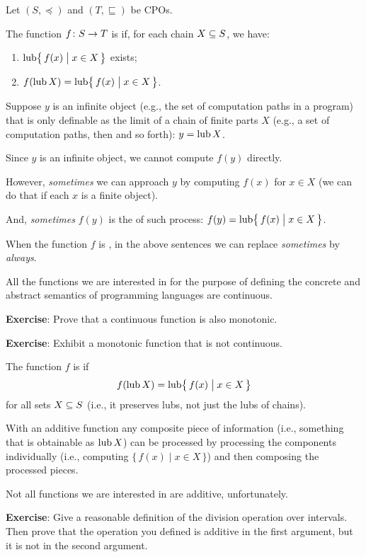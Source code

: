 \documentclass[online,helvetica,a4]{chaksem}
\begin{document}
\begin{slide} 

Let $(S, \preceq)$ and $(T, \sqsubseteq)$ be CPOs.

The function $\mathord{f}\colon S\to T$ is  if,
for each chain $X \subseteq S$, we have:
\begin{enumerate}
\item
$\mathop{\mathrm{lub}}\nolimits\bigl\{\, f(x) \bigm| x \in X \,\bigr\}$ exists;
\item
$f(\mathop{\mathrm{lub}}\nolimits X) = \mathop{\mathrm{lub}}\nolimits\bigl\{\, f(x) \bigm| x \in X \,\bigr\}$.
\end{enumerate}

Suppose $y$ is an infinite object
(e.g., the set of  computation paths in a program)
that is only definable as the limit of a chain of finite parts $X$
(e.g., a set of  computation paths, then 
and so forth): $y = \mathop{\mathrm{lub}}\nolimits X$.

Since $y$ is an infinite object, we cannot compute $f(y)$ directly.
\end{slide}

\begin{slide} 

However, \emph{sometimes} we can approach $y$ by computing $f(x)$ for $x \in X$
(we can do that if each $x$ is a finite object).

And, \emph{sometimes} $f(y)$ is the  of such process:
$f(y) = \mathop{\mathrm{lub}}\nolimits\bigl\{\, f(x) \bigm| x \in X \,\bigr\}$.

When the function $f$ is , in the above sentences
we can replace \emph{sometimes} by \emph{always}.

All the functions we are interested in for the purpose of defining the
concrete and abstract semantics of programming languages are continuous.

\vfill
\textbf{Exercise}: Prove that a continuous function is also monotonic.

\vfill
\textbf{Exercise}: Exhibit a monotonic function that is not continuous.

\end{slide}

\begin{slide} 

The function $f$ is  if
\[
	f(\mathop{\mathrm{lub}}\nolimits X) = \mathop{\mathrm{lub}}\nolimits\bigl\{\, f(x) \bigm| x \in X \,\bigr\}
\]
for all sets $X \subseteq S$ (i.e., it preserves  lubs, not just
the lubs of chains).

With an additive function
any composite piece of information (i.e., something that is obtainable
as $\mathop{\mathrm{lub}}\nolimits X$) can be processed by processing the components individually
(i.e., computing $\{\, f(x) \mid x \in X \,\}$)
and then composing the processed pieces.

Not all functions we are interested in are additive, unfortunately.

\vfill
\textbf{Exercise}: Give a reasonable definition of the division operation
over intervals.  Then prove that the operation you defined is additive
in the first argument, but it is not in the second argument.

\end{slide}
\end{document}
